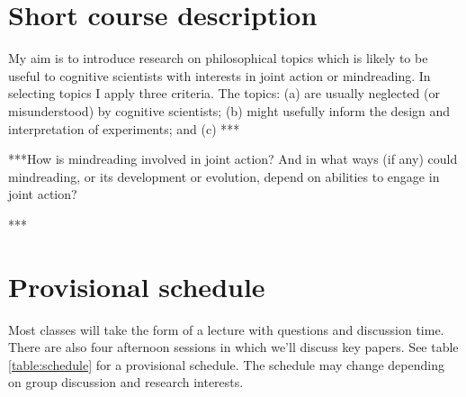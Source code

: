 \documentclass[12pt,\papersize]{extarticle}
\begin{document}
\setlength\footnotesep{1em}




\maketitle
%
%




\section{Short course description}
My aim is to introduce research on philosophical topics which is likely to be useful to cognitive scientists with interests in joint action or mindreading. 
In selecting topics I apply three criteria.
The topics: (a) are usually neglected (or misunderstood) by cognitive scientists;
(b) might usefully inform the design and interpretation of experiments;
and
(c) ***


***How is mindreading involved in joint action?  And in what ways (if any) could mindreading, or its development or evolution, depend on abilities to engage in joint action?  

***



\section{Provisional schedule}

Most classes will take the form of a lecture with questions and discussion time. 
There are also four afternoon sessions in which we'll discuss key papers.
See table \vref{table:schedule} for a provisional schedule. 
The schedule may change depending on group discussion and research interests.
\end{document}
